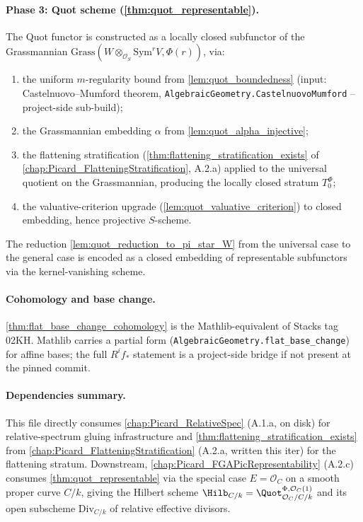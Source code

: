 \paragraph{Phase 3: Quot scheme (\cref{thm:quot_representable}).}
The Quot functor is constructed as a locally closed subfunctor of the
Grassmannian
\(\mathrm{Grass}(W \otimes_{\mathcal{O}_S} \mathrm{Sym}^r V, \Phi(r))\), via:
\begin{enumerate}
  \item the uniform \(m\)-regularity bound from
    \cref{lem:quot_boundedness} (input: Castelnuovo--Mumford theorem,
    \texttt{AlgebraicGeometry.CastelnuovoMumford} -- project-side sub-build);
  \item the Grassmannian embedding \(\alpha\) from
    \cref{lem:quot_alpha_injective};
  \item the flattening stratification (\cref{thm:flattening_stratification_exists}
    of \cref{chap:Picard_FlatteningStratification}, A.2.a) applied to the
    universal quotient on the Grassmannian, producing the locally closed
    stratum \(T_0^\Phi\);
  \item the valuative-criterion upgrade
    (\cref{lem:quot_valuative_criterion}) to closed embedding, hence
    projective \(S\)-scheme.
\end{enumerate}
The reduction \cref{lem:quot_reduction_to_pi_star_W} from the universal
case to the general case is encoded as a closed embedding of representable
subfunctors via the kernel-vanishing scheme.

\paragraph{Cohomology and base change.}
\cref{thm:flat_base_change_cohomology} is the Mathlib-equivalent of
Stacks tag 02KH. Mathlib carries a partial form
(\texttt{AlgebraicGeometry.flat\_base\_change}) for affine bases; the
full \(R^i f_*\) statement is a project-side bridge if not present at the
pinned commit.

\paragraph{Dependencies summary.}
This file directly consumes
\cref{chap:Picard_RelativeSpec} (A.1.a, on disk) for relative-spectrum
gluing infrastructure and
\cref{thm:flattening_stratification_exists} from
\cref{chap:Picard_FlatteningStratification} (A.2.a, written this iter)
for the flattening stratum. Downstream, \cref{chap:Picard_FGAPicRepresentability}
(A.2.c) consumes \cref{thm:quot_representable} via the special case
\(E = \mathcal{O}_C\) on a smooth proper curve \(C/k\), giving the Hilbert
scheme \(\Hilb_{C/k} = \Quot^{\Phi,\mathcal{O}_C(1)}_{\mathcal{O}_C/C/k}\)
and its open subscheme \(\mathrm{Div}_{C/k}\) of relative effective divisors.

